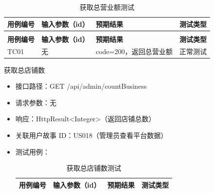\begin{levellist}
\begin{levellist}
\begin{itemize}
\begin{longtable}{>{\centering\arraybackslash}m{2cm} >{\centering\arraybackslash}m{4cm} >{\centering\arraybackslash}m{5cm} >{\centering\arraybackslash}m{2cm}}
                      \caption{获取总营业额测试} \label{tab:training}                             \\

                      \toprule
                      \textbf{用例编号} & \textbf{输入参数（id）} & \textbf{预期结果}   & \textbf{测试类型} \\
                      \midrule
                      \endfirsthead

                      \multicolumn{4}{c}{{\tablename\ \thetable{} 续表}}                    \\
                      \toprule
                      \textbf{用例编号} & \textbf{输入参数（id）} & \textbf{预期结果}   & \textbf{测试类型} \\
                      \midrule
                      \endhead

                      \bottomrule
                      \endfoot


                      TC01          & 无                 & code=200，返回总营业额 & 正常测试          \\
                  \end{longtable}
        \end{itemize}

        \item 获取总店铺数
        \begin{itemize}
            \item 接口路径：GET /api/admin/countBusiness
            \item 请求参数：无
            \item 响应：HttpResult<Integer>（返回店铺总数）
            \item 关联用户故事 ID：US018（管理员查看平台数据）
            \item 测试用例：
                  \begin{longtable}{>{\centering\arraybackslash}m{2cm} >{\centering\arraybackslash}m{4cm} >{\centering\arraybackslash}m{5cm} >{\centering\arraybackslash}m{2cm}}

                      \caption{获取总店铺数测试} \label{tab:training}                             \\

                      \toprule
                      \textbf{用例编号} & \textbf{输入参数（id）} & \textbf{预期结果}   & \textbf{测试类型} \\
                      \midrule
                      \endfirsthead


\end{longtable}
\end{itemize}
\end{levellist}
\end{levellist}
